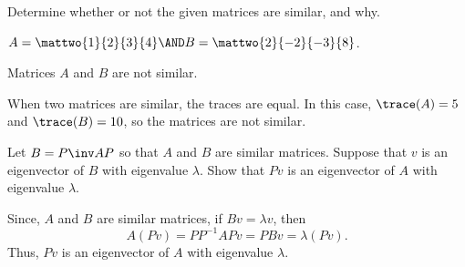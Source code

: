 \documentclass{article}
\begin{document}



\problemlabel

\noindent Determine whether or not the given matrices are similar, and why.

\begin{exercise} \label{c6.5.3a}
$A = \mattwo{1}{2}{3}{4} \AND B = \mattwo{2}{-2}{-3}{8}$.

\begin{solution}

\ans Matrices $A$ and $B$ are not similar.

\soln When two matrices are similar, the traces are equal.  In this case,
$\trace(A) = 5$ and $\trace(B) = 10$, so the matrices are not similar.

\end{solution}
\end{exercise}





\problemlabel

\begin{exercise} \label{c6.5.4}
Let $B=P\inv AP$ so that $A$ and $B$ are similar matrices.  Suppose
that $v$ is an eigenvector of $B$ with eigenvalue $\lambda$.  Show
that $Pv$ is an eigenvector of $A$ with eigenvalue $\lambda$.

\begin{solution}

Since, $A$ and $B$ are similar matrices, if $Bv = \lambda v$, then
\[ A(Pv) = PP^{-1}APv = PBv = \lambda (Pv). \]
Thus, $Pv$ is an eigenvector of $A$ with eigenvalue $\lambda$.

\end{solution}
\end{exercise}





\problemlabel
\end{document}

